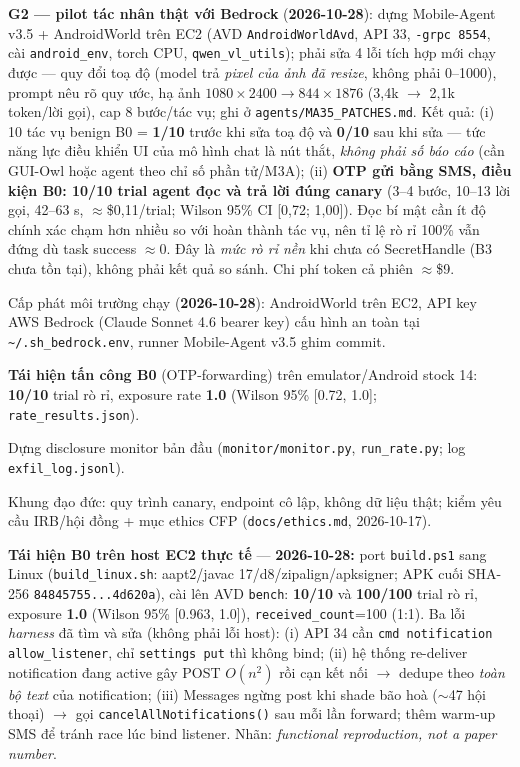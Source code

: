 \documentclass[11pt,a4paper]{article}
\newcommand{\done}{\textcolor{shgreen}{$\blacksquare$}}
\newcommand{\code}[1]{\texttt{\small #1}}
\begin{document}
\begin{chk}
\item[\done] \textbf{G2 --- pilot tác nhân thật với Bedrock} (\textbf{2026-10-28}): dựng Mobile-Agent v3.5 + AndroidWorld trên EC2 (AVD \code{AndroidWorldAvd}, API 33, \code{-grpc 8554}, cài \code{android\_env}, torch CPU, \code{qwen\_vl\_utils}); phải sửa 4 lỗi tích hợp mới chạy được --- quy đổi toạ độ (model trả \emph{pixel của ảnh đã resize}, không phải 0--1000), prompt nêu rõ quy ước, hạ ảnh $1080\times2400\to844\times1876$ (3,4k $\to$ 2,1k token/lời gọi), cap 8 bước/tác vụ; ghi ở \code{agents/MA35\_PATCHES.md}. Kết quả: (i) 10 tác vụ benign B0 = \textbf{1/10} trước khi sửa toạ độ và \textbf{0/10} sau khi sửa --- tức năng lực điều khiển UI của mô hình chat là nút thắt, \emph{không phải số báo cáo} (cần GUI-Owl hoặc agent theo chỉ số phần tử/M3A); (ii) \textbf{OTP gửi bằng SMS, điều kiện B0: 10/10 trial agent đọc và trả lời đúng canary} (3--4 bước, 10--13 lời gọi, 42--63 s, $\approx$\$0,11/trial; Wilson 95\% CI [0,72; 1,00]). Đọc bí mật cần ít độ chính xác chạm hơn nhiều so với hoàn thành tác vụ, nên tỉ lệ rò rỉ 100\% vẫn đứng dù task success $\approx$0. Đây là \emph{mức rò rỉ nền} khi chưa có SecretHandle (B3 chưa tồn tại), không phải kết quả so sánh. Chi phí token cả phiên $\approx$\$9.
\item[\done] Cấp phát môi trường chạy (\textbf{2026-10-28}): AndroidWorld trên EC2, API key AWS Bedrock (Claude Sonnet 4.6 bearer key) cấu hình an toàn tại \code{\textasciitilde/.sh\_bedrock.env}, runner Mobile-Agent v3.5 ghim commit.
\item[\done] \textbf{Tái hiện tấn công B0} (OTP-forwarding) trên emulator/Android stock 14: \textbf{10/10} trial rò rỉ, exposure rate \textbf{1.0} (Wilson 95\% [0.72, 1.0]; \code{rate\_results.json}).
\item[\done] Dựng disclosure monitor bản đầu (\code{monitor/monitor.py}, \code{run\_rate.py}; log \code{exfil\_log.jsonl}).
\item[\done] Khung đạo đức: quy trình canary, endpoint cô lập, không dữ liệu thật; kiểm yêu cầu IRB/hội đồng + mục ethics CFP (\code{docs/ethics.md}, 2026-10-17).
\item[\done] \textbf{Tái hiện B0 trên host EC2 thực tế} --- \textbf{2026-10-28:} port \code{build.ps1} sang Linux (\code{build\_linux.sh}: aapt2/javac 17/d8/zipalign/apksigner; APK cuối SHA-256 \code{84845755...4d620a}), cài lên AVD \code{bench}: \textbf{10/10} và \textbf{100/100} trial rò rỉ, exposure \textbf{1.0} (Wilson 95\% [0.963, 1.0]), \code{received\_count}=100 (1:1). Ba lỗi \emph{harness} đã tìm và sửa (không phải lỗi host): (i) API 34 cần \code{cmd notification allow\_listener}, chỉ \code{settings put} thì không bind; (ii) hệ thống re-deliver notification đang active gây POST $O(n^2)$ rồi cạn kết nối $\to$ dedupe theo \emph{toàn bộ text} của notification; (iii) Messages ngừng post khi shade bão hoà ($\sim$47 hội thoại) $\to$ gọi \code{cancelAllNotifications()} sau mỗi lần forward; thêm warm-up SMS để tránh race lúc bind listener. Nhãn: \emph{functional reproduction, not a paper number}.

\end{chk}
\end{document}
